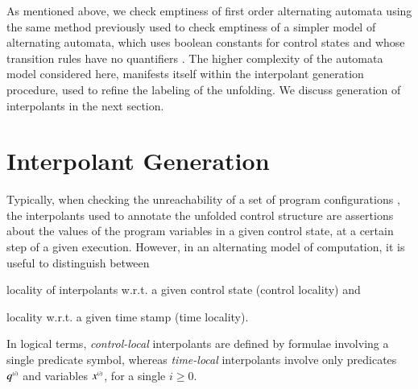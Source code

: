 As mentioned above, we check emptiness of first order alternating
automata using the same method previously used to check emptiness of a
simpler model of alternating automata, which uses boolean constants
for control states and whose transition rules have no quantifiers
\cite{IosifXu18}. The higher complexity of the automata model
considered here, manifests itself within the interpolant generation
procedure, used to refine the labeling of the unfolding. We discuss
generation of interpolants in the next section.

\section{Interpolant Generation}\label{sec:interpolants}

Typically, when checking the unreachability of a set of program
configurations \cite{McMillan06}, the interpolants used to annotate
the unfolded control structure are assertions about the values of the
program variables in a given control state, at a certain step of a
given execution. However, in an alternating model of computation, it
is useful to distinguish between
\begin{inparaenum}[(i)]
\item locality of interpolants w.r.t. a given control state (control
  locality) and
%
\item locality w.r.t. a given time stamp (time locality).
\end{inparaenum} 
In logical terms, \emph{control-local} interpolants are defined by
formulae involving a single predicate symbol, whereas
\emph{time-local} interpolants involve only predicates ${q}^{\scriptscriptstyle{({i})}}$
and variables ${x}^{\scriptscriptstyle{({i})}}$, for a single $i \geq 0$.

